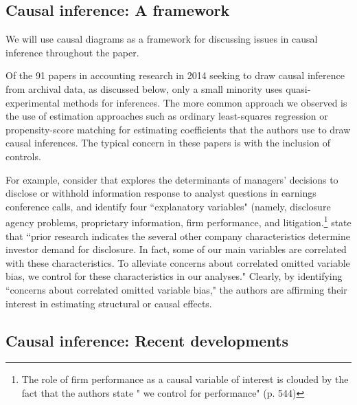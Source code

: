 \documentclass[11pt]{amsart}
\begin{document}
\subsection{Causal inference: A framework}
We will use causal diagrams as a framework for discussing issues in causal inference throughout the paper.

Of the 91 papers in accounting research in 2014 seeking to draw causal inference from archival data, as discussed below, only a small minority uses quasi-experimental methods for inferences.
The more common approach we observed is the use of estimation approaches such as ordinary least-squares regression or propensity-score matching for estimating coefficients that the authors use to draw causal inferences.
The typical concern in these papers is with the inclusion of controls.


For example, consider \cite{Hollander:2010jg} that explores the determinants of managers' decisions to disclose or withhold information response to analyst questions in earnings conference calls, and identify four ``explanatory variables" (namely, disclosure agency problems, proprietary information, firm performance, and litigation.\footnote {The role of firm performance as a causal variable of interest is clouded by the fact that the authors state " we control for performance" (p. 544)} \cite{Hollander:2010jg} state that ``prior research indicates the several other company characteristics determine investor demand for disclosure. In fact, some of our main variables are correlated with these characteristics.
To alleviate concerns about correlated omitted variable bias, we control for these characteristics in our analyses."
Clearly, by identifying ``concerns about correlated omitted variable bias," the authors are affirming their interest in estimating structural or causal effects.

\subsection{Causal inference: Recent developments}


\end{document}
